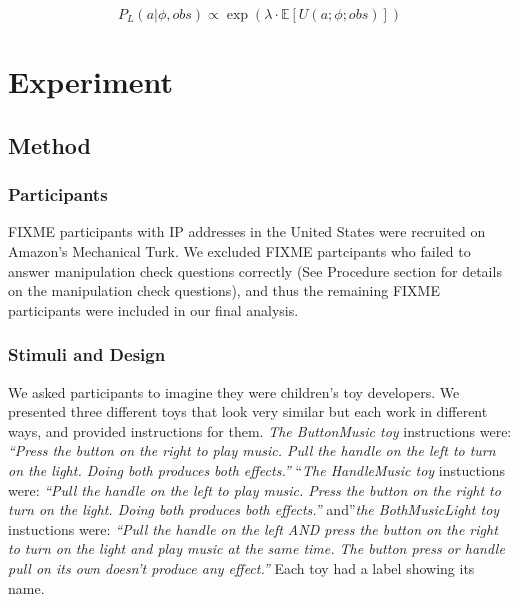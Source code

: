 \documentclass[10pt, letterpaper]{article}
\begin{document}
\[ P_L(a | \phi, obs) \propto \exp(\lambda \cdot \mathbb{E}[U(a;\phi; obs)])\]

\section{Experiment}\label{experiment}

\subsection{Method}\label{method}

\subsubsection{Participants}\label{participants}

FIXME participants with IP addresses in the United States were recruited
on Amazon's Mechanical Turk. We excluded FIXME partcipants who failed to
answer manipulation check questions correctly (See Procedure section for
details on the manipulation check questions), and thus the remaining
FIXME participants were included in our final analysis.

\subsubsection{Stimuli and Design}\label{stimuli-and-design}

We asked participants to imagine they were children's toy developers. We
presented three different toys that look very similar but each work in
different ways, and provided instructions for them. \emph{The
ButtonMusic toy} instructions were: \emph{``Press the button on the
right to play music. Pull the handle on the left to turn on the light.
Doing both produces both effects.''} ``\emph{The HandleMusic toy}
instuctions were: \emph{``Pull the handle on the left to play music.
Press the button on the right to turn on the light. Doing both produces
both effects.''} and''\emph{the BothMusicLight toy} instuctions were:
\emph{``Pull the handle on the left AND press the button on the right to
turn on the light and play music at the same time. The button press or
handle pull on its own doesn't produce any effect.''} Each toy had a
label showing its name.
\end{document}

